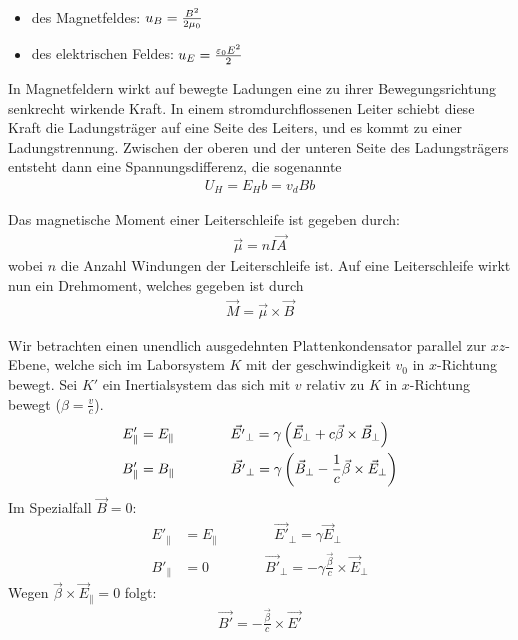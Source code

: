 \begin{itemize}
    \item des Magnetfeldes: $u_B = \frac{B^2}{2 \mu_0}$
    \item des elektrischen Feldes: $u_E = \frac{\varepsilon_0 E^2}{2}$
\end{itemize}

\vspace{1\baselineskip}


In Magnetfeldern wirkt auf bewegte Ladungen eine zu ihrer Bewegungsrichtung senkrecht wirkende
Kraft. In einem stromdurchflossenen Leiter schiebt diese Kraft die Ladungsträger auf eine Seite
des Leiters, und es kommt zu einer Ladungstrennung. Zwischen der oberen und der unteren Seite
des Ladungsträgers entsteht dann eine Spannungsdifferenz, die sogenannte 
\begin{align*}
    U_H = E_H b = v_d B b
\end{align*}

\vspace{1\baselineskip}


Das magnetische Moment einer Leiterschleife ist gegeben durch:
\begin{align*}
    \vec{\mu} = n I \vec{A}
\end{align*}
wobei $n$ die Anzahl Windungen der Leiterschleife ist. Auf eine Leiterschleife wirkt nun ein
Drehmoment, welches gegeben ist durch
\begin{align*}
    \vec{M} = \vec{\mu} \times \vec{B}
\end{align*}

\vspace{1\baselineskip}


Wir betrachten einen unendlich ausgedehnten Plattenkondensator parallel zur $xz$-Ebene,
welche sich im Laborsystem $K$ mit der geschwindigkeit $v_0$ in $x$-Richtung bewegt.
Sei $K'$ ein Inertialsystem das sich mit $v$ relativ zu $K$ in $x$-Richtung bewegt
($\beta = \frac{v}{c}$).
\begin{align*}
    E'_{\parallel} &= E_{\parallel}
    \quad \quad \quad \quad
    \vec{E'}_{\perp} = \gamma \left( \vec{E}_{\perp} + c \vec{\beta} \times \vec{B}_{\perp} \right)
    \\
    B'_{\parallel} &= B_{\parallel}
    \quad \quad \quad \quad
    \vec{B'}_{\perp} = \gamma \left( \vec{B}_{\perp} - \frac{1}{c} \vec{\beta} \times \vec{E}_{\perp} \right)
\end{align*}
Im Spezialfall $\vec{B} = 0$:
\begin{align*}
    E'_{\parallel} &= E_{\parallel}
    \quad \quad \quad \quad
    \vec{E'}_{\perp} = \gamma \vec{E}_{\perp}
    \\
    B'_{\parallel} &= 0
    \quad \quad \quad \quad
    \vec{B'}_{\perp} = - \gamma \frac{\vec{\beta}}{c} \times \vec{E}_{\perp}
\end{align*}
Wegen $\vec{\beta} \times \vec{E}_{\parallel} = 0$ folgt:
\begin{align*}
    \vec{B'} = - \frac{\vec{\beta}}{c} \times \vec{E'}
\end{align*}
